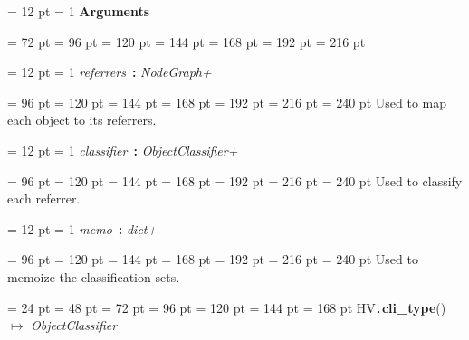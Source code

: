 {{{{{{\par \pagebreak[3.100000] \noindent \hangindent = 12 pt \hangafter = 1 
{\bf Arguments\/}\par}
{\par \noindent  \leftskip = 72 pt  \leftmargini = 96 pt  \leftmarginii = 120 pt  \leftmarginiii = 144 pt  \leftmarginiv = 168 pt  \leftmarginv = 192 pt  \leftmarginvi = 216 pt {\par \noindent
{\par \pagebreak[3.000000] \noindent \hangindent = 12 pt \hangafter = 1 
{\em referrers\/}~{\bf :}  {\em NodeGraph+\/}\par}
{\par \noindent  \leftskip = 96 pt  \leftmargini = 120 pt  \leftmarginii = 144 pt  \leftmarginiii = 168 pt  \leftmarginiv = 192 pt  \leftmarginv = 216 pt  \leftmarginvi = 240 pt  Used to map each object to its referrers.\par}
{\par \pagebreak[3.000000] \noindent \hangindent = 12 pt \hangafter = 1 
{\em classifier\/}~{\bf :}  {\em ObjectClassifier+\/}\par}
{\par \noindent  \leftskip = 96 pt  \leftmargini = 120 pt  \leftmarginii = 144 pt  \leftmarginiii = 168 pt  \leftmarginiv = 192 pt  \leftmarginv = 216 pt  \leftmarginvi = 240 pt  Used to classify each referrer.\par}
{\par \pagebreak[3.000000] \noindent \hangindent = 12 pt \hangafter = 1 
{\em memo\/}~{\bf :}  {\em dict+\/}\par}
{\par \noindent  \leftskip = 96 pt  \leftmargini = 120 pt  \leftmarginii = 144 pt  \leftmarginiii = 168 pt  \leftmarginiv = 192 pt  \leftmarginv = 216 pt  \leftmarginvi = 240 pt  Used to memoize the classification sets.
\par}
\par}
\par}
\par}
\par}
\par}
\par}
{\par \noindent  \leftskip = 24 pt  \leftmargini = 48 pt  \leftmarginii = 72 pt  \leftmarginiii = 96 pt  \leftmarginiv = 120 pt  \leftmarginv = 144 pt  \leftmarginvi = 168 pt HV{\tt .\/}{\bf {\large {\bf cli{\_}type\/}}\/}() \(\mapsto \)  {\em ObjectClassifier\/}{\par \noindent
}}}

